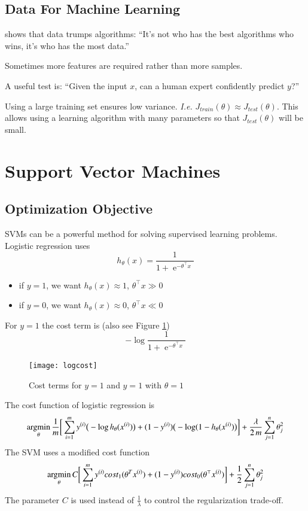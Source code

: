 \documentclass[a4paper,twoside,10pt]{article}
\begin{document}
\subsection{Data For Machine Learning}
\citep{banko2001scaling} shows that data trumps algorithms:
``It’s not who has the best algorithms who wins, it’s who has the most data.''

Sometimes more features are required rather than more samples.

A useful test is: ``Given the input $x$, can a human expert confidently predict $y$?''

Using a large training set ensures low variance. \emph{I.e.} $J_{train}(\theta)\approx J_{test}(\theta)$.
This allows using a learning algorithm with many parameters so that $J_{test}(\theta)$ will be small.

\section{Support Vector Machines}
\subsection{Optimization Objective}
\acp{SVM} can be a powerful method for solving supervised learning problems.
Logistic regression uses
\begin{equation*}
  h_\theta(x)=\frac{1}{1+\operatorname{e}^{-\theta^\top x}}
\end{equation*}
\begin{itemize}
  \item if $y=1$, we want $h_\theta(x)\approx 1$, $\theta^\top x\gg0$
  \item if $y=0$, we want $h_\theta(x)\approx 0$, $\theta^\top x\ll0$
\end{itemize}
For $y=1$ the cost term is (also see Figure \ref{fig:logcost})
\begin{equation*}
  -\operatorname{log}\frac{1}{1+\operatorname{e}^{-\theta^\top x}}
\end{equation*}
\begin{figure}[htbp]
  \begin{center}
    \texttt{[image: logcost]}
    \caption{Cost terms for $y=1$ and $y=1$ with $\theta=1$\label{fig:logcost}}
  \end{center}
\end{figure}

The cost function of logistic regression is
\begin{equation*}
  \mathop{\operatorname{argmin}}_\theta\frac{1}{m}\bigg[\displaystyle\sum_{i=1}^my^{(i)}\big(-\operatorname{log}h_\theta(x^{(i)})\big)+(1-y^{(i)})\big(-\operatorname{log}(1-h_\theta(x^{(i)})\big)\bigg]+\frac{\lambda}{2\,m}\sum_{j=1}^n\theta_j^2
\end{equation*}
The \ac{SVM} uses a modified cost function
\begin{equation*}
  \mathop{\operatorname{argmin}}_\theta C\bigg[\displaystyle\sum_{i=1}^my^{(i)} cost_1(\theta^Tx^{(i)})+(1-y^{(i)})cost_0(\theta^\top x^{(i)})\bigg]+\frac{1}{2}\sum_{j=1}^n\theta_j^2
\end{equation*}
The parameter $C$ is used instead of $\frac{1}{\lambda}$ to control the regularization trade-off.
\end{document}
